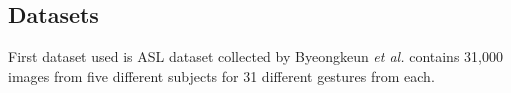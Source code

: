 \documentclass[a0,landscape]{a0poster}
\begin{document}
\begin{multicols}{4}
\color{DarkSlateGray} %




\section*{Datasets}

First dataset used is ASL dataset collected by Byeongkeun \textit{et al.} contains 31,000 images from five different subjects for 31 different gestures from each. 



\end{multicols}
\end{document}

